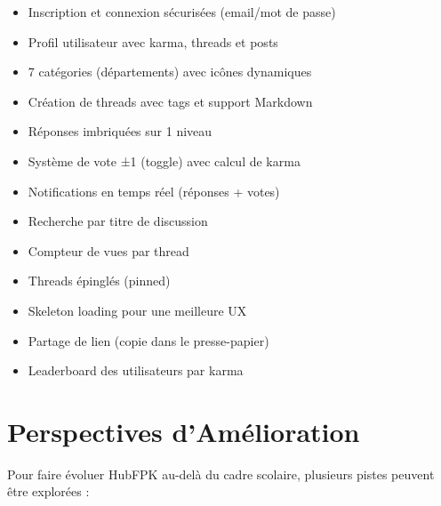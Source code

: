\documentclass[12pt, a4paper]{report}
\begin{document}
\begin{itemize}
    \item Inscription et connexion sécurisées (email/mot de passe)
    \item Profil utilisateur avec karma, threads et posts
    \item 7 catégories (départements) avec icônes dynamiques
    \item Création de threads avec tags et support Markdown
    \item Réponses imbriquées sur 1 niveau
    \item Système de vote ±1 (toggle) avec calcul de karma
    \item Notifications en temps réel (réponses + votes)
    \item Recherche par titre de discussion
    \item Compteur de vues par thread
    \item Threads épinglés (pinned)
    \item Skeleton loading pour une meilleure UX
    \item Partage de lien (copie dans le presse-papier)
    \item Leaderboard des utilisateurs par karma
\end{itemize}

\section{Perspectives d'Amélioration}

Pour faire évoluer HubFPK au-delà du cadre scolaire, plusieurs pistes peuvent être explorées :
\end{document}
